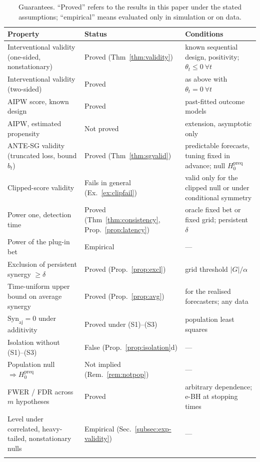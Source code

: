 \documentclass[pdflatex,sn-mathphys-ay]{sn-jnl}%
\theoremstyle{thmstyleone}%
\theoremstyle{thmstyletwo}%
\theoremstyle{thmstylethree}%
\newcommand{\Syn}{\mathrm{Syn}}
\begin{document}
\begin{table}[h]
\caption{Guarantees. ``Proved'' refers to the results in this paper under the stated
assumptions; ``empirical'' means evaluated only in simulation or on data.}\label{tab:guarantees}
\footnotesize
\begin{tabular*}{\textwidth}{@{\extracolsep\fill}p{4.6cm}p{2.2cm}p{4.9cm}}
\toprule
Property & Status & Conditions \\
\midrule
Interventional validity (one-sided, nonstationary) & Proved (Thm~\ref{thm:validity}) & known sequential design, positivity; $\theta_t\le0\ \forall t$ \\
Interventional validity (two-sided) & Proved & as above with $\theta_t=0\ \forall t$ \\
AIPW score, known design & Proved & past-fitted outcome models \\
AIPW, estimated propensity & Not proved & extension, asymptotic only \\
ANTE-SG validity (truncated loss, bound $b_t$) & Proved (Thm~\ref{thm:sgvalid}) & predictable forecasts, tuning fixed in advance; null $H_0^{\mathrm{preq}}$ \\
Clipped-score validity & Fails in general (Ex.~\ref{ex:clipfail}) & valid only for the clipped null or under conditional symmetry \\
Power one, detection time & Proved (Thm~\ref{thm:consistency}, Prop.~\ref{prop:latency}) & oracle fixed bet or fixed grid; persistent $\delta$ \\
Power of the plug-in bet & Empirical & --- \\
Exclusion of persistent synergy $\ge\delta$ & Proved (Prop.~\ref{prop:excl}) & grid threshold $|G|/\alpha$ \\
Time-uniform upper bound on average synergy & Proved (Prop.~\ref{prop:avg}) & for the realised forecasters; any data \\
$\Syn_{\mathrm{aj}}=0$ under additivity & Proved under (S1)--(S3) & population least squares \\
Isolation without (S1)--(S3) & False (Prop.~\ref{prop:isolation}d) & --- \\
Population null $\Rightarrow H_0^{\mathrm{preq}}$ & Not implied (Rem.~\ref{rem:notpop}) & --- \\
FWER / FDR across $m$ hypotheses & Proved & arbitrary dependence; e-BH at stopping times \\
Level under correlated, heavy-tailed, nonstationary nulls & Empirical (Sec.~\ref{subsec:exp-validity}) & --- \\
\botrule
\end{tabular*}
\end{table}
\end{document}
